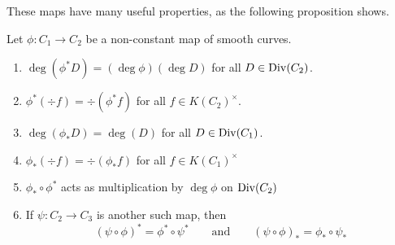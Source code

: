 These maps have many useful properties, as the following proposition shows.

\begin{proposition}
	\label{prop:divisor-map-properties}
	Let $\phi: C_1 \to C_2$ be a non-constant map of smooth curves.
	\begin{enumerate}[label=(\alph*), itemsep=0em]
		\item $\deg(\phi^*D) = (\deg\phi)(\deg D)$ for all $D \in \operatorname{Div}(C_2)$.
		\item $\phi^*(\div f) = \div(\phi^* f)$ for all $f \in K(C_2)^\times$.
		\item $\deg(\phi_*D) = \deg(D)$ for all $D \in \operatorname{Div}(C_1)$.
		\item $\phi_*(\div f) = \div(\phi_* f)$ for all $f\in K(C_1)^\times$
		\item $\phi_*\circ \phi^*$ acts as multiplication by $\deg \phi$
			on $\operatorname{Div}(C_2)$
		\item If $\psi: C_2\to C_3$ is another such map,
			then
			\begin{equation*}
				(\psi\circ\phi)^* = \phi^*\circ\psi^*
				\qquad\textrm{and}\qquad
				(\psi\circ\phi)_* = \phi_*\circ\psi_*
			\end{equation*}
	\end{enumerate}
\end{proposition}

